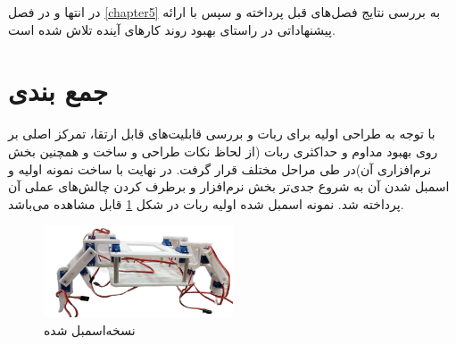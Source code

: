 در انتها و در فصل
\ref{chapter5}
به بررسی نتایج فصل‌های قبل پرداخته و سپس با ارائه پیشنهاداتی در راستای بهبود روند کار‌های آینده تلاش شده است.
\section{جمع بندی}

با توجه به طراحی اولیه برای ربات و بررسی قابلیت‌های قابل ارتقا، تمرکز اصلی بر روی بهبود مداوم و حداکثری ربات (از لحاظ نکات طراحی و ساخت و همچنین بخش نرم‌افزاری آن)در طی مراحل مختلف قرار گرفت. در نهایت با ساخت نمونه اولیه و اسمبل
\noindent\unskip{}
شدن آن به شروع جدی‌تر بخش نرم‌افزار و برطرف کردن چالش‌های عملی آن پرداخته شد.
نمونه اسمبل شده اولیه ربات در شکل
\ref{نسخه‌اسمبل شده}
قابل مشاهده می‌باشد.

\begin{figure}[h]
	\centering
	\includegraphics[width=0.5\textwidth]{./images/Chapter1/Assembled_Robot_without_background}	
	\caption[نسخه‌اسمبل شده]{نسخه‌اسمبل شده}
	\label{نسخه‌اسمبل شده}
\end{figure}
\noindent
\unskip

